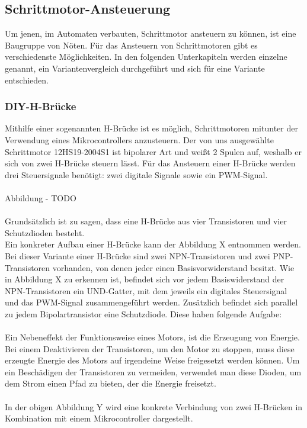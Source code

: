 \subsection{Schrittmotor-Ansteuerung}
Um jenen, im Automaten verbauten, Schrittmotor ansteuern zu können, ist eine Baugruppe von Nöten. Für das Ansteuern von Schrittmotoren gibt es verschiedenste Möglichkeiten.
In den folgenden Unterkapiteln werden einzelne genannt, ein Variantenvergleich durchgeführt und sich für eine Variante entschieden.

\newpage
\subsubsection{DIY-H-Brücke}
Mithilfe einer sogenannten H-Brücke ist es möglich, Schrittmotoren mitunter der Verwendung eines Mikrocontrollers anzusteuern. Der von uns ausgewählte Schrittmotor
12HS19-2004S1 ist bipolarer Art und weißt 2 Spulen auf, weshalb er sich von zwei H-Brücke steuern lässt. Für das Ansteuern einer H-Brücke werden drei Steuersignale benötigt: zwei digitale Signale sowie ein PWM-Signal.
\\\\ Abbildung - TODO \\\\
Grundsätzlich ist zu sagen, dass eine H-Brücke aus vier Transistoren und vier Schutzdioden besteht. \\
Ein konkreter Aufbau einer H-Brücke kann der Abbildung X entnommen werden. Bei dieser Variante einer H-Brücke sind zwei NPN-Transistoren und zwei PNP-Transistoren vorhanden, von denen jeder einen Basisvorwiderstand besitzt.
Wie in Abbildung X zu erkennen ist, befindet sich vor jedem Basiswiderstand der NPN-Transistoren ein UND-Gatter, mit dem jeweils ein digitales Steuersignal und das PWM-Signal zusammengeführt werden.
Zusätzlich befindet sich parallel zu jedem Bipolartransistor eine Schutzdiode. Diese haben folgende Aufgabe: \\\\
Ein Nebeneffekt der Funktionsweise eines Motors, ist die Erzeugung von Energie. Bei einem Deaktivieren der Transistoren, um den Motor zu stoppen, muss diese erzeugte Energie des Motors auf irgendeine Weise freigesetzt werden können.
Um ein Beschädigen der Transistoren zu vermeiden, verwendet man diese Dioden, um dem Strom einen Pfad zu bieten, der die Energie freisetzt. \\\\
In der obigen Abbildung Y wird eine konkrete Verbindung von zwei H-Brücken in Kombination mit einem Mikrocontroller dargestellt.
